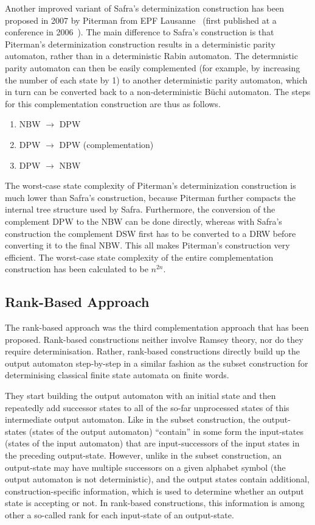 Another improved variant of Safra's determinization construction has been proposed in 2007 by Piterman from EPF Lausanne~\cite{2007_piterman} (first published at a conference in 2006~\cite{2006_piterman}). The main difference to Safra's construction is that Piterman's determinization construction results in a deterministic parity automaton, rather than in a deterministic Rabin automaton. The determnistic parity automaton can then be easily complemented (for example, by increasing the number of each state by 1) to another deterministic parity automaton, which in turn can be converted back to a non-deterministic Büchi automaton. The steps for this complementation construction are thus as follows.
\begin{enumerate}
\item NBW $\longrightarrow$ DPW
\item DPW $\longrightarrow$ DPW (complementation)
\item DPW $\longrightarrow$ NBW
\end{enumerate}

The worst-case state complexity of Piterman's determinization construction is much lower than Safra's construction, because Piterman further compacts the internal tree structure used by Safra. Furthermore, the conversion of the complement DPW to the NBW can be done directly, whereas with Safra's construction the complement DSW first has to be converted to a DRW before converting it to the final NBW. This all makes Piterman's construction very efficient. The worst-case state complexity of the entire complementation construction has been calculated to be $n^{2n}$.


\subsection{Rank-Based Approach}
The rank-based approach was the third complementation approach that has been proposed. Rank-based constructions neither involve Ramsey theory, nor do they require determinisation. Rather, rank-based constructions directly build up the output automaton step-by-step in a similar fashion as the subset construction for determinising classical finite state automata on finite words.

They start building the output automaton with an initial state and then repeatedly add successor states to all of the so-far unprocessed states of this intermediate output automaton. Like in the subset construction, the output-states (states of the output automaton) ``contain'' in some form the input-states (states of the input automaton) that are input-successors of the input states in the preceding output-state. However, unlike in the subset construction, an output-state may have multiple successors on a given alphabet symbol (the output automaton is not deterministic), and the output states contain additional, construction-specific information, which is used to determine whether an output state is accepting or not. In rank-based constructions, this information is among other a so-called rank for each input-state of an output-state.




